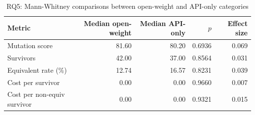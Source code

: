 \begin{table}[htbp]
\centering
{\small
\begin{tabular}{l|rrrr}
\toprule
\textbf{Metric} & \textbf{Median open-weight} & \textbf{Median API-only} & \textbf{$p$} & \textbf{Effect size} \\
\midrule
Mutation score & 81.60 & 80.20 & 0.6936 & 0.069 \\
Survivors & 42.00 & 37.00 & 0.8564 & 0.031 \\
Equivalent rate (\%) & 12.74 & 16.57 & 0.8231 & 0.039 \\
Cost per survivor & 0.00 & 0.00 & 0.9660 & 0.007 \\
Cost per non-equiv survivor & 0.00 & 0.00 & 0.9321 & 0.015 \\
\bottomrule
\end{tabular}
}
\caption{RQ5: Mann-Whitney comparisons between open-weight and API-only categories}
\label{tab:rq5-pairwise}
\end{table}